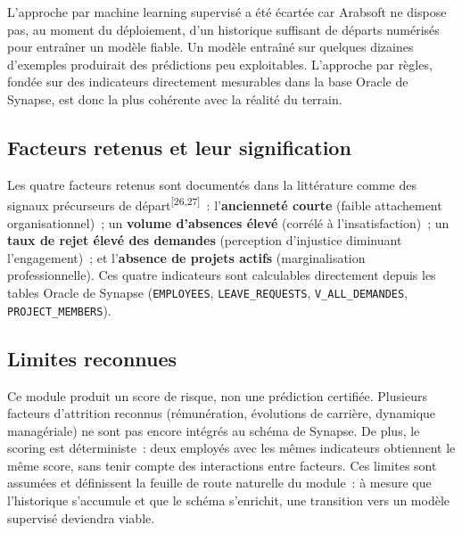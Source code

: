L'approche par machine learning supervisé a été écartée car Arabsoft ne dispose pas, au
moment du déploiement, d'un historique suffisant de départs numérisés pour entraîner
un modèle fiable. Un modèle entraîné sur quelques dizaines d'exemples produirait
des prédictions peu exploitables. L'approche par règles, fondée sur des indicateurs
directement mesurables dans la base Oracle de Synapse, est donc la plus cohérente
avec la réalité du terrain.

\subsection{Facteurs retenus et leur signification}

Les quatre facteurs retenus sont documentés dans la littérature comme des signaux précurseurs de départ\textsuperscript{[26,27]}~: l'\textbf{ancienneté courte} (faible attachement organisationnel)~; un \textbf{volume d'absences élevé} (corrélé à l'insatisfaction)~; un \textbf{taux de rejet élevé des demandes} (perception d'injustice diminuant l'engagement)~; et l'\textbf{absence de projets actifs} (marginalisation professionnelle). Ces quatre indicateurs sont calculables directement depuis les tables Oracle de Synapse (\texttt{EMPLOYEES}, \texttt{LEAVE\_REQUESTS}, \texttt{V\_ALL\_DEMANDES}, \texttt{PROJECT\_MEMBERS}).

\subsection{Limites reconnues}

Ce module produit un score de risque, non une prédiction certifiée. Plusieurs facteurs d'attrition reconnus (rémunération, évolutions de
carrière, dynamique managériale) ne sont pas encore intégrés au schéma de Synapse.
De plus, le scoring est déterministe~: deux employés avec les mêmes indicateurs
obtiennent le même score, sans tenir compte des interactions entre facteurs. Ces
limites sont assumées et définissent la feuille de route naturelle du module~: à
mesure que l'historique s'accumule et que le schéma s'enrichit, une transition vers
un modèle supervisé deviendra viable.
